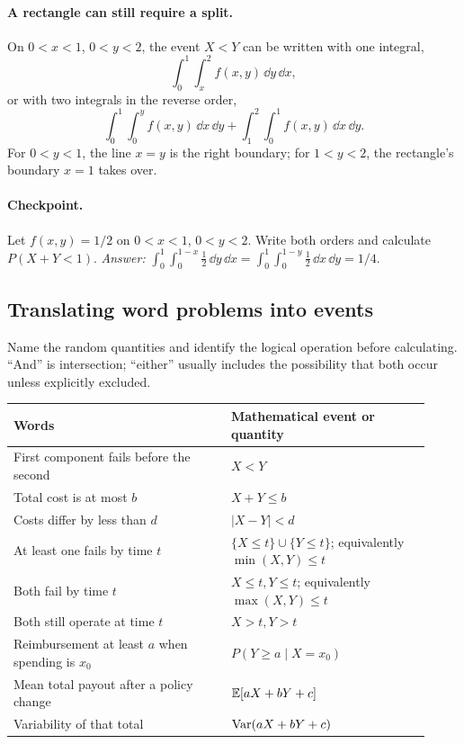 \paragraph{A rectangle can still require a split.} On $0<x<1$, $0<y<2$, the event $X<Y$ can be written with one integral,
\[
 \int_0^1\int_x^2 f(x,y)\,\dd y\,\dd x,
\]
or with two integrals in the reverse order,
\[
 \int_0^1\int_0^y f(x,y)\,\dd x\,\dd y
 +\int_1^2\int_0^1 f(x,y)\,\dd x\,\dd y.
\]
For $0<y<1$, the line $x=y$ is the right boundary; for $1<y<2$, the rectangle's boundary $x=1$ takes over.

\paragraph{Checkpoint.} Let $f(x,y)=1/2$ on $0<x<1$, $0<y<2$. Write both orders and calculate $P(X+Y<1)$. \emph{Answer:} $\int_0^1\int_0^{1-x}\tfrac12\,\dd y\,\dd x=\int_0^1\int_0^{1-y}\tfrac12\,\dd x\,\dd y=1/4$.

\subsection{Translating word problems into events}

Name the random quantities and identify the logical operation before calculating. ``And'' is intersection; ``either'' usually includes the possibility that both occur unless explicitly excluded.

\begin{center}
\begin{tabular}{@{}p{0.48\linewidth}p{0.44\linewidth}@{}}
\toprule
Words & Mathematical event or quantity\\
\midrule
First component fails before the second & $X<Y$\\
Total cost is at most $b$ & $X+Y\leq b$\\
Costs differ by less than $d$ & $|X-Y|<d$\\
At least one fails by time $t$ & $\{X\leq t\}\cup\{Y\leq t\}$; equivalently $\min(X,Y)\leq t$\\
Both fail by time $t$ & $X\leq t,Y\leq t$; equivalently $\max(X,Y)\leq t$\\
Both still operate at time $t$ & $X>t,Y>t$\\
Reimbursement at least $a$ when spending is $x_0$ & $P(Y\geq a\mid X=x_0)$\\
Mean total payout after a policy change & $\mathbb E[aX+bY+c]$\\
Variability of that total & $\operatorname{Var}(aX+bY+c)$\\
\bottomrule
\end{tabular}
\end{center}

